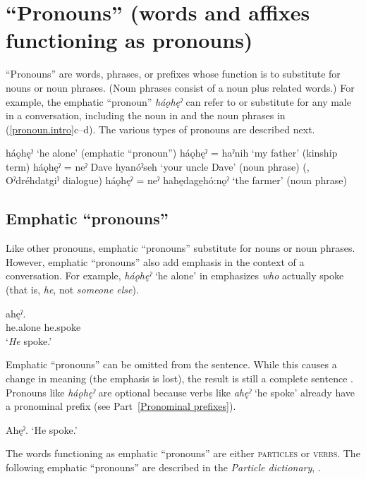 \chapter{“Pronouns” (words and affixes functioning as pronouns)} \label{ch:’Pronouns’ (words and affixes that function as pronouns)}
“Pronouns” are words, phrases, or prefixes whose function is to substitute for nouns or noun phrases. (Noun phrases consist of a noun plus related words.) For example, the emphatic “pronoun” \textit{háǫhęˀ}  can refer to or substitute for any male in a conversation, including the noun  in  and the noun phrases in (\ref{pronoun.intro}c--d). The various types of pronouns are described next.

\ea\label{pronoun.intro}
\ea\label{pronoun.introa} háǫhęˀ ‘he alone’ (emphatic “pronoun”)
\ex\label{pronoun.introb} háǫhęˀ = haˀnih ‘my father’ (kinship term)
\ex\label{pronoun.introc} háǫhęˀ = neˀ Dave hyanóˀseh ‘your uncle Dave’ (noun phrase) (\cite[339]{mithun_watewayestanih_1984}, Oˀdréhdatgiˀ dialogue)
\ex\label{pronoun.introd} háǫhęˀ = neˀ hahędage̱hó:nǫˀ ‘the farmer’ (noun phrase)
\z
\z

\section{Emphatic “pronouns”} \label{ch:’Emphatic pronouns’}
Like other pronouns, emphatic “pronouns” substitute for nouns or noun phrases. However, emphatic “pronouns” also add emphasis in the context of a conversation. For example, \textit{háǫhęˀ} ‘he alone’ in  emphasizes \emph{who} actually spoke (that is, \emph{he}, not \emph{someone else}). 

\ea\label{ex:emph}
 \gll {} ahęˀ. \\
he.alone he.spoke\\
\glt ‘\emph{He} spoke.’
\z

Emphatic “pronouns” can be omitted from the sentence. While this causes a change in meaning (the emphasis is lost), the result is still a complete sentence . Pronouns like \textit{háǫhęˀ} are optional because verbs like \textit{ahęˀ} ‘he spoke’ already have a pronominal prefix (see Part~\ref{Pronominal prefixes}).

\ea\label{ex:emph2} Ahęˀ. ‘He spoke.’
\z

The words functioning as emphatic “pronouns” are either \textsc{particles} or \textsc{verbs}. The following emphatic “pronouns” are described in the \textit{Particle dictionary}, .

